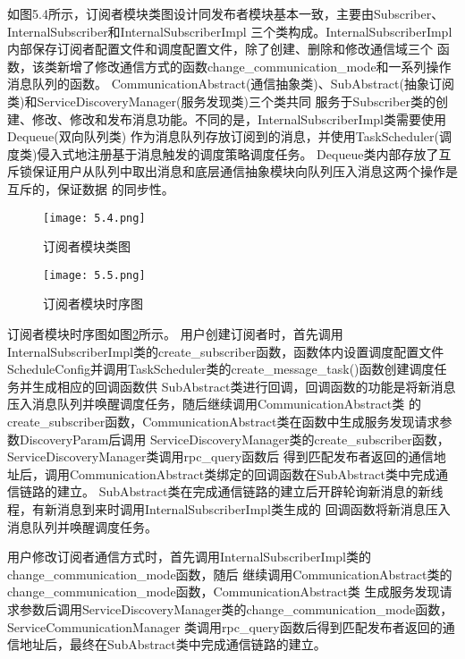 如图5.4所示，订阅者模块类图设计同发布者模块基本一致，主要由Subscriber、InternalSubscriber和InternalSubscriberImpl
三个类构成。InternalSubscriberImpl内部保存订阅者配置文件和调度配置文件，除了创建、删除和修改通信域三个
函数，该类新增了修改通信方式的函数change\_communication\_mode和一系列操作消息队列的函数。
CommunicationAbstract(通信抽象类)、SubAbstract(抽象订阅类)和ServiceDiscoveryManager(服务发现类)三个类共同
服务于Subscriber类的创建、修改、修改和发布消息功能。不同的是，InternalSubscriberImpl类需要使用Dequeue(双向队列类)
作为消息队列存放订阅到的消息，并使用TaskScheduler(调度类)侵入式地注册基于消息触发的调度策略调度任务。
Dequeue类内部存放了互斥锁保证用户从队列中取出消息和底层通信抽象模块向队列压入消息这两个操作是互斥的，保证数据
的同步性。

\begin{figure}[htb]
  \centering
  \texttt{[image: 5.4.png]}
  \caption{订阅者模块类图}
  \label{subscriber_class}
\end{figure}

\begin{figure}[htb]
  \centering
  \texttt{[image: 5.5.png]}
  \caption{订阅者模块时序图}
  \label{subscriber_timesequence}
\end{figure}

订阅者模块时序图如图\ref{subscriber_timesequence}所示。
用户创建订阅者时，首先调用InternalSubscriberImpl类的create\_subscriber函数，函数体内设置调度配置文件
ScheduleConfig并调用TaskScheduler类的create\_message\_task()函数创建调度任务并生成相应的回调函数供
SubAbstract类进行回调，回调函数的功能是将新消息压入消息队列并唤醒调度任务，随后继续调用CommunicationAbstract类
的create\_subscriber函数，CommunicationAbstract类在函数中生成服务发现请求参数DiscoveryParam后调用
ServiceDiscoveryManager类的create\_subscriber函数，ServiceDiscoveryManager类调用rpc\_query函数后
得到匹配发布者返回的通信地址后，调用CommunicationAbstract类绑定的回调函数在SubAbstract类中完成通信链路的建立。
SubAbstract类在完成通信链路的建立后开辟轮询新消息的新线程，有新消息到来时调用InternalSubscriberImpl类生成的
回调函数将新消息压入消息队列并唤醒调度任务。

用户修改订阅者通信方式时，首先调用InternalSubscriberImpl类的change\_communication\_mode函数，随后
继续调用CommunicationAbstract类的change\_communication\_mode函数，CommunicationAbstract类
生成服务发现请求参数后调用ServiceDiscoveryManager类的change\_communication\_mode函数，ServiceCommunicationManager
类调用rpc\_query函数后得到匹配发布者返回的通信地址后，最终在SubAbstract类中完成通信链路的建立。


